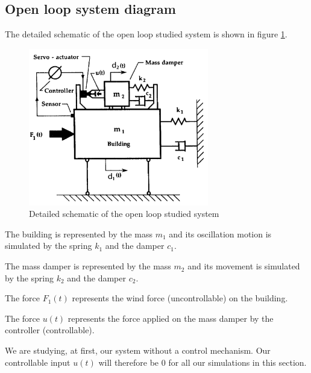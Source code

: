\subsection{Open loop system diagram}
The detailed schematic of the open loop studied system is shown in figure \ref{fig:detailed_schematic}.
\begin{figure}[H]
    \centering
    \includegraphics[width=0.7\textwidth]{resources/pdf/open-loop-diagram.pdf}
    \caption{Detailed schematic of the open loop studied system \cite{sciencedirect_amd}}
    \label{fig:detailed_schematic}
\end{figure}
The building is represented by the mass $m_1$ and its oscillation motion is simulated by the spring $k_1$ and the damper $c_1$.\par
The mass damper is represented by the mass $m_2$ and its movement is simulated by the spring $k_2$ and the damper $c_2$.\par
The force $F_1(t)$ represents the wind force (uncontrollable) on the building.\par
The force $u(t)$ represents the force applied on the mass damper by the controller (controllable).\par
We are studying, at first, our system without a control mechanism. Our controllable input $u(t)$ will therefore be \num{0} for all our simulations in this section.
